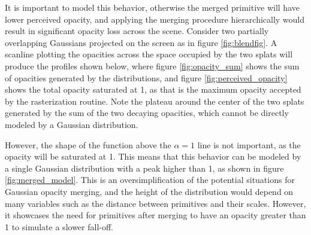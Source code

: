 It is important to model this behavior, otherwise the merged primitive will have lower perceived opacity, and applying the merging procedure hierarchically would result in significant opacity loss across the scene. Consider two partially overlapping Gaussians projected on the screen as in figure \ref{fig:blendfig}. A scanline plotting the opacities across the space occupied by the two splats will produce the profiles shown below, where figure \ref{fig:opacity_sum} shows the sum of opacities generated by the distributions, and figure \ref{fig:perceived_opacity} shows the total opacity saturated at 1, as that is the maximum opacity accepted by the rasterization routine. Note the plateau around the center of the two splats generated by the sum of the two decaying opacities, which cannot be directly modeled by a Gaussian distribution. 

However, the shape of the function above the $\alpha = 1$ line is not important, as the opacity will be saturated at 1. This means that this behavior can be modeled by a single Gaussian distribution with a peak higher than 1, as shown in figure \ref{fig:merged_model}. This is an oversimplification of the potential situations for Gaussian opacity merging, and the height of the distribution would depend on many variables such as the distance between primitives and their scales. However, it showcases the need for primitives after merging to have an opacity greater than 1 to simulate a slower fall-off.

\begin{figure}[H]
\end{figure}

